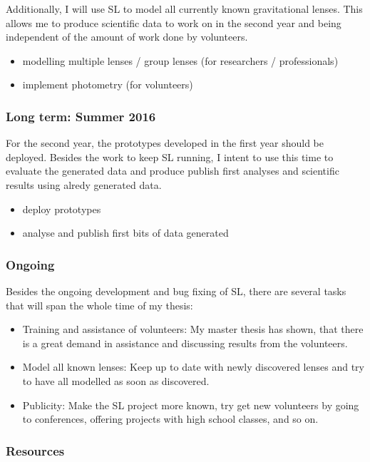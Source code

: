 \documentclass[11pt]{article}
\begin{document}
Additionally, I will use SL to model all currently known gravitational lenses.
This allows me to produce scientific data to work on in the second year and being independent of the amount of work done by volunteers.


\begin{itemize}
  \item modelling multiple lenses / group lenses (for researchers / professionals)
  \item implement photometry (for volunteers)
\end{itemize}


\subsubsection{Long term: Summer 2016}

For the second year, the prototypes developed in the first year should be deployed.
Besides the work to keep SL running, I intent to use this time to evaluate the generated data and produce publish first analyses and scientific results using alredy generated data.

\begin{itemize}
  \item deploy prototypes
  \item analyse and publish first bits of data generated
\end{itemize}


\subsubsection{Ongoing}
\label{sec:ongoing}

Besides the ongoing development and bug fixing of SL, there are several tasks that will span the whole time of my thesis:
\begin{itemize}
  \item Training and assistance of volunteers: My master thesis has shown, that there is a great demand in assistance and discussing results from the volunteers.
  \item Model all known lenses: Keep up to date with newly discovered lenses and try to have all modelled as soon as discovered.
  \item Publicity: Make the SL project more known, try get new volunteers by going to conferences, offering projects with high school classes, and so on.
\end{itemize}


\subsubsection{Resources}
\end{document}
